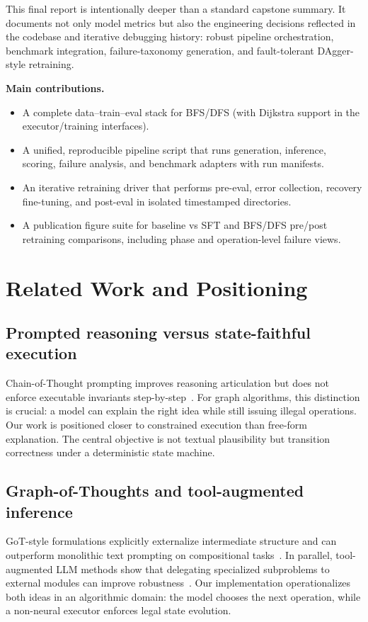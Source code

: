 \documentclass[sigplan,screen]{acmart}
\begin{document}
This final report is intentionally deeper than a standard capstone summary.
It documents not only model metrics but also the engineering decisions reflected in the codebase and iterative debugging history: robust pipeline orchestration, benchmark integration, failure-taxonomy generation, and fault-tolerant DAgger-style retraining.

\textbf{Main contributions.}
\begin{itemize}
  \item A complete data--train--eval stack for BFS/DFS (with Dijkstra support in the executor/training interfaces).
  \item A unified, reproducible pipeline script that runs generation, inference, scoring, failure analysis, and benchmark adapters with run manifests.
  \item An iterative retraining driver that performs pre-eval, error collection, recovery fine-tuning, and post-eval in isolated timestamped directories.
  \item A publication figure suite for baseline vs SFT and BFS/DFS pre/post retraining comparisons, including phase and operation-level failure views.
\end{itemize}

\section{Related Work and Positioning}
\subsection{Prompted reasoning versus state-faithful execution}
Chain-of-Thought prompting improves reasoning articulation but does not enforce executable invariants step-by-step~\cite{wei2022cot}.
For graph algorithms, this distinction is crucial: a model can explain the right idea while still issuing illegal operations.
Our work is positioned closer to constrained execution than free-form explanation.
The central objective is not textual plausibility but transition correctness under a deterministic state machine.

\subsection{Graph-of-Thoughts and tool-augmented inference}
GoT-style formulations explicitly externalize intermediate structure and can outperform monolithic text prompting on compositional tasks~\cite{got2024,besta2024got}.
In parallel, tool-augmented LLM methods show that delegating specialized subproblems to external modules can improve robustness~\cite{schick2023toolformer}.
Our implementation operationalizes both ideas in an algorithmic domain: the model chooses the next operation, while a non-neural executor enforces legal state evolution.
\end{document}
